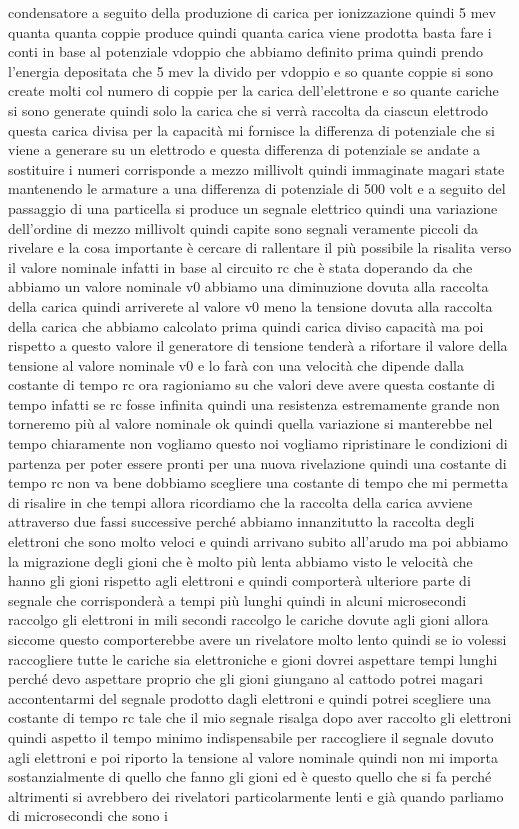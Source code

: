 condensatore a seguito della produzione di carica per ionizzazione quindi 5 mev quanta quanta coppie produce quindi quanta carica viene prodotta basta fare i conti in base al potenziale vdoppio che abbiamo definito prima quindi prendo l'energia depositata che 5 mev la divido per vdoppio e so quante coppie si sono create molti col numero di coppie per la carica dell'elettrone e so quante cariche si sono generate quindi solo la carica che si verrà raccolta da ciascun elettrodo questa carica divisa per la capacità mi fornisce la differenza di potenziale che si viene a generare su un elettrodo e questa differenza di potenziale se andate a sostituire i numeri corrisponde a mezzo millivolt quindi immaginate magari state mantenendo le armature a una differenza di potenziale di 500 volt e a seguito del passaggio di una particella si produce un segnale elettrico quindi una variazione dell'ordine di mezzo millivolt quindi capite sono segnali veramente piccoli da rivelare e la cosa importante è cercare di rallentare il più possibile la risalita verso il valore nominale infatti in base al circuito rc che è stata doperando da che abbiamo un valore nominale v0 abbiamo una diminuzione dovuta alla raccolta della carica quindi arriverete al valore v0 meno la tensione dovuta alla raccolta della carica che abbiamo calcolato prima quindi carica diviso capacità ma poi rispetto a questo valore il generatore di tensione tenderà a rifortare il valore della tensione al valore nominale v0 e lo farà con una velocità che dipende dalla costante di tempo rc ora ragioniamo su che valori deve avere questa costante di tempo infatti se rc fosse infinita quindi una resistenza estremamente grande non torneremo più al valore nominale ok quindi quella variazione si manterebbe nel tempo chiaramente non vogliamo questo noi vogliamo ripristinare le condizioni di partenza per poter essere pronti per una nuova rivelazione quindi una costante di tempo rc non va bene dobbiamo scegliere una costante di tempo che mi permetta di risalire in che tempi allora ricordiamo che la raccolta della carica avviene attraverso due fassi successive perché abbiamo innanzitutto la raccolta degli elettroni che sono molto veloci e quindi arrivano subito all'arudo ma poi abbiamo la migrazione degli gioni che è molto più lenta abbiamo visto le velocità che hanno gli gioni rispetto agli elettroni e quindi comporterà ulteriore parte di segnale che corrisponderà a tempi più lunghi quindi in alcuni microsecondi raccolgo gli elettroni in mili secondi raccolgo le cariche dovute agli gioni allora siccome questo comporterebbe avere un rivelatore molto lento quindi se io volessi raccogliere tutte le cariche sia elettroniche e gioni dovrei aspettare tempi lunghi perché devo aspettare proprio che gli gioni giungano al cattodo potrei magari accontentarmi del segnale prodotto dagli elettroni e quindi potrei scegliere una costante di tempo rc tale che il mio segnale risalga dopo aver raccolto gli elettroni quindi aspetto il tempo minimo indispensabile per raccogliere il segnale dovuto agli elettroni e poi riporto la tensione al valore nominale quindi non mi importa sostanzialmente di quello che fanno gli gioni ed è questo quello che si fa perché altrimenti si avrebbero dei rivelatori particolarmente lenti e già quando parliamo di microsecondi che sono i 